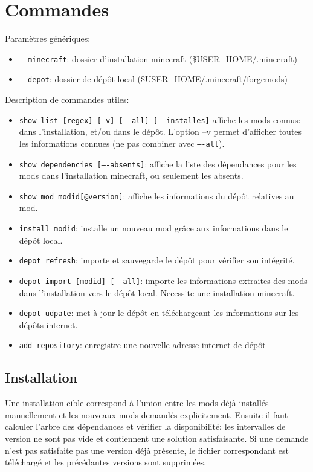 \documentclass{article}
\begin{document}
\section{Commandes}
Paramètres génériques:
\begin{itemize}
    \item \texttt{----minecraft}: dossier d'installation minecraft (\$USER\_HOME/.minecraft)
    \item \texttt{----depot}: dossier de dépôt local (\$USER\_HOME/.minecraft/forgemods)
\end{itemize}

\medskip
Description de commandes utiles:
\begin{itemize}
    \item \texttt{show list [regex] [--v] [----all] [----installes]} affiche les mods connus: dans l'installation, et/ou dans le dépôt.
L'option --v permet d'afficher toutes les informations connues (ne pas combiner avec \texttt{----all}).
    \item \texttt{show dependencies [----absents]}: affiche la liste des dépendances pour les mods dans l'installation minecraft, ou seulement les absents.
    \item \texttt{show mod modid[@version]}: affiche les informations du dépôt relatives au mod.
    \item \texttt{install modid}: installe un nouveau mod grâce aux informations dans le dépôt local.
    \item \texttt{depot refresh}: importe et sauvegarde le dépôt pour vérifier son intégrité.
    \item \texttt{depot import [modid] [----all]}: importe les informations extraites des mods dans l'installation vers le dépôt local.
Necessite une installation minecraft.
    \item \texttt{depot udpate}: met à jour le dépôt en téléchargeant les informations sur les dépôts internet.
    \item \texttt{add--repository}: enregistre une nouvelle adresse internet de dépôt
\end{itemize}


\subsection{Installation}
Une installation cible correspond à l'union entre les mods déjà installés manuellement et les nouveaux mods demandés explicitement.
Ensuite il faut calculer l'arbre des dépendances et vérifier la disponibilité: les intervalles de version ne sont pas vide et contiennent une solution satisfaisante.
Si une demande n'est pas satisfaite pas une version déjà présente, le fichier correspondant est téléchargé et les précédantes versions sont supprimées.
\end{document}
